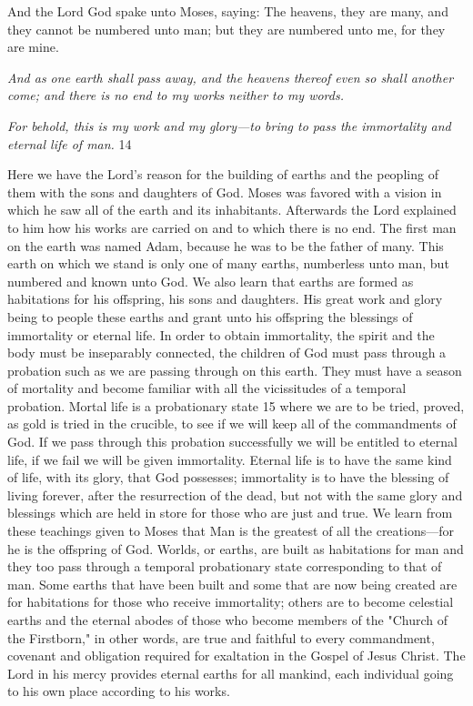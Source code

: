 And the Lord God spake unto Moses, saying: The heavens, they are many, and they cannot
be numbered unto man; but they are numbered unto me, for they are mine.

\textit{And as one earth shall pass away, and the heavens thereof even so shall another come; and
there is no end to my works neither to my words.}

\textit{For behold, this is my work and my glory—to bring to pass the immortality and eternal life of
man.} 14

Here we have the Lord's reason for the building of earths and the peopling of them with the
sons and daughters of God. Moses was favored with a vision in which he saw all of the earth
and its inhabitants. Afterwards the Lord explained to him how his works are carried on and to
which there is no end. The first man on the earth was named Adam, because he was to be the
father of many. This earth on which we stand is only one of many earths, numberless unto
man, but numbered and known unto God. We also learn that earths are formed as habitations
for his offspring, his sons and daughters. His great work and glory being to people these
earths and grant unto his offspring the blessings of immortality or eternal life. In order to
obtain immortality, the spirit and the body must be inseparably connected, the children of
God must pass through a probation such as we are passing through on this earth. They must
have a season of mortality and become familiar with all the vicissitudes of a temporal
probation. Mortal life is a probationary state 15 where we are to be tried, proved, as gold is
tried in the crucible, to see if we will keep all of the commandments of God. If we pass
through this probation successfully we will be entitled to eternal life, if we fail we will be
given immortality. Eternal life is to have the same kind of life, with its glory, that God
possesses; immortality is to have the blessing of living forever, after the resurrection of the
dead, but not with the same glory and blessings which are held in store for those who are just
and true. We learn from these teachings given to Moses that Man is the greatest of all the
creations—for he is the offspring of God. Worlds, or earths, are built as habitations for man
and they too pass through a temporal probationary state corresponding to that of man. Some
earths that have been built and some that are now being created are for habitations for those
who receive immortality; others are to become celestial earths and the eternal abodes of those
who become members of the "Church of the Firstborn," in other words, are true and faithful
to every commandment, covenant and obligation required for exaltation in the Gospel of
Jesus Christ. The Lord in his mercy provides eternal earths for all mankind, each individual
going to his own place according to his works.

